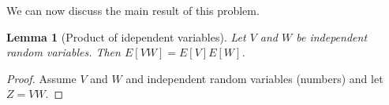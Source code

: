 \documentclass[12pt]{article}
\newtheorem{lemma}{Lemma}[section]
\begin{document}
    We can now discuss the main result of this problem.
\begin{lemma}[Product of idependent variables]
    Let $V$ and $W$ be independent random variables. Then $E[VW] = E[V]E[W]$.
\end{lemma}
\begin{proof}
    Assume $V$ and $W$ and independent random variables (numbers) and let $Z=VW$.
    

\end{proof}
\end{document}
